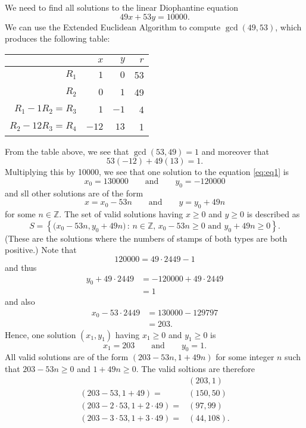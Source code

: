 \documentclass[11pt]{article}
\def\integers{\mathbb{Z}}
\begin{document}
\begin{enumerate}
\begin{Solution}
We need to find all solutions to the linear Diophantine equation
\[
 49x + 53 y = 10000. \tag{$\ast$}\label{eq:eq1}
\]
We can use the Extended Euclidean Algorithm to compute $\gcd(49,53)$, which produces the following table:
\begin{center}
\begin{tabular}{|r|r|r|r|}
\hline
 & $x$ & $y$ & $r$\\\hline
 $R_1$             &   $1$ &   $0$ &   53\\
 $R_2$             &   $0$ &   $1$ &   49\\
 $R_1 -1R_2 = R_3$ &   $1$ &  $-1$ &   4\\
 $R_2 -12R_3 = R_4$ &  $-12$ &  $13$ &   1\\\hline
\end{tabular}
\end{center}
From the table above, we see that $\gcd(53,49)=1$ and moreover that 
\[
 53(-12) + 49(13) = 1.
\]
Multiplying this by 10000, we see that one solution to the equation \eqref{eq:eq1} is 
\[
 x_0 = 130000 \qquad\text{and} \qquad y_0 = -120000
\]
and sll other solutions are of the form
\[
 x = x_0 - 53n \qquad\text{and} \qquad y = y_0 +49n
\]
for some $n\in\integers$. The set of valid solutions having $x\geq0$ and $y\geq0$ is described as
\[
 S = \left\{\big(x_0 - 53n,y_0 +49n\big)\, :\, n\in\integers, \, x_0 - 53n\geq 0 \text{ and }y_0 +49n\geq 0\right\}.
\]
(These are the solutions where the numbers of stamps of both types are both positive.) Note that 
\[
 120000 =  49\cdot2449 -1
\]
and thus 
\begin{align*}
 y_0 + 49\cdot 2449 &= -120000 + 49\cdot2449 \\&= 1
\end{align*}
and also
\begin{align*}
 x_0 - 53\cdot 2449 &= 130000 -129797 \\&= 203.
\end{align*}
Hence, one solution $(x_1,y_1)$ having $x_1\geq0$ and $y_1\geq0$ is 
\[
 x_1 = 203\qquad\text{and}\qquad y_0 = 1.
\]
All valid solutions are of the form $(203-53n,1+49n)$ for some integer $n$ such that  $203-53n\geq 0$ and $1+49n\geq0$. The valid soltions are therefore
\begin{align*}
&(203,1)\\
(203-53, 1 + 49) = &(150, 50)\\
(203-2\cdot53, 1 + 2\cdot49) = &{}(97, 99)\\
(203-3\cdot53, 1 + 3\cdot49) = &{}(44, 108).

\end{align*}
\end{Solution}
\end{enumerate}
\end{document}
